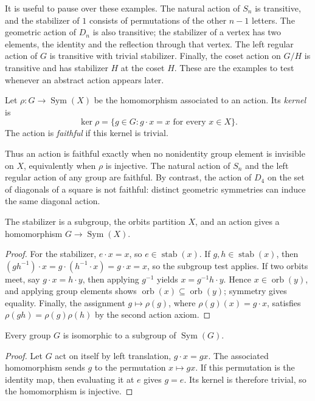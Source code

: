 It is useful to pause over these examples.  The natural action of \(S_n\) is
transitive, and the stabilizer of \(1\) consists of permutations of the other
\(n-1\) letters.  The geometric action of \(D_n\) is also transitive; the
stabilizer of a vertex has two elements, the identity and the reflection through
that vertex.  The left regular action of \(G\) is transitive with trivial
stabilizer.  Finally, the coset action on \(G/H\) is transitive and has
stabilizer \(H\) at the coset \(H\).  These are the examples to test whenever
an abstract action appears later.

\begin{definition}
Let \(\rho:G\to\operatorname{Sym}(X)\) be the homomorphism associated to an
action.  Its \emph{kernel} is
\[\ker\rho=\{g\in G:g\cdot x=x\text{ for every }x\in X\}.\]
The action is \emph{faithful} if this kernel is trivial.
\end{definition}

Thus an action is faithful exactly when no nonidentity group element is
invisible on \(X\), equivalently when \(\rho\) is injective.  The natural
action of \(S_n\) and the left regular action of any group are faithful.  By
contrast, the action of \(D_4\) on the set of diagonals of a square is not
faithful: distinct geometric symmetries can induce the same diagonal action.

\begin{proposition}
The stabilizer is a subgroup, the orbits partition \(X\), and an action gives
a homomorphism \(G\to\operatorname{Sym}(X)\).
\end{proposition}
\begin{proof}
For the stabilizer, \(e\cdot x=x\), so \(e\in\operatorname{stab}(x)\). If
\(g,h\in\operatorname{stab}(x)\),
then \((gh^{-1})\cdot x=g\cdot(h^{-1}\cdot x)=g\cdot x=x\), so the subgroup
test applies.  If two orbits meet, say \(g\cdot x=h\cdot y\), then applying
\(g^{-1}\) yields \(x=g^{-1}h\cdot y\). Hence
\(x\in\operatorname{orb}(y)\), and applying group elements shows
\(\operatorname{orb}(x)\subseteq\operatorname{orb}(y)\); symmetry gives
equality. Finally,
the assignment \(g\mapsto\rho(g)\), where \(\rho(g)(x)=g\cdot x\), satisfies
\(\rho(gh)=\rho(g)\rho(h)\) by the second action axiom.
\end{proof}

\begin{theorem}[Cayley]
Every group \(G\) is isomorphic to a subgroup of \(\operatorname{Sym}(G)\).
\end{theorem}
\begin{proof}
Let \(G\) act on itself by left translation, \(g\cdot x=gx\).  The associated
homomorphism sends \(g\) to the permutation \(x\mapsto gx\).  If this
permutation is the identity map, then evaluating it at \(e\) gives \(g=e\).
Its kernel is therefore trivial, so the homomorphism is injective.
\end{proof}

